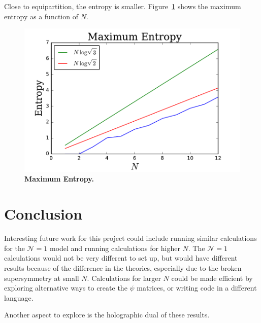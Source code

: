 \documentclass[12pt]{article} %
\renewcommand{\cal}{\mathcal}
\begin{document}
Close to equipartition, the entropy is smaller. Figure~\ref{fig:maxentropy} shows the maximum entropy as a function of $N$.

\begin{figure}
	\centering
	\includegraphics[width=.5\textwidth]{maxentropy}
	\caption{\textbf{Maximum Entropy.} }
	\label{fig:maxentropy}
\end{figure}

\section{Conclusion} \label{sec:concl}

Interesting future work for this project could include running similar calculations for the $\cal N=1$ model and running calculations for higher $N$. The $\cal N=1$ calculations would not be very different to set up, but would have different results because of the difference in the theories, especially due to the broken supersymmetry at small $N$. Calculations for larger $N$ could be made efficient by exploring alternative ways to create the $\psi$ matrices, or writing code in a different language.

Another aspect to explore is the holographic dual of these results.

\printbibliography
\end{document}

